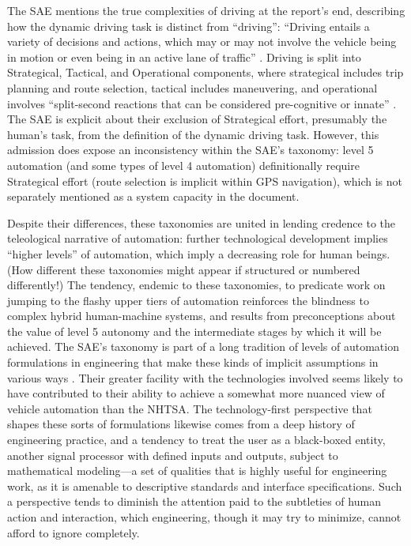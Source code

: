 The SAE mentions the true complexities of driving at the report's end,
describing how the dynamic driving task is distinct from ``driving'':
``Driving entails a variety of decisions and actions, which may or may
not involve the vehicle being in motion or even being in an active
lane of traffic'' \cite[p. 12]{SAE}. Driving is split into Strategical, Tactical, and
Operational components, where strategical includes trip planning and
route selection, tactical includes maneuvering, and operational
involves ``split-second reactions that can be considered pre-cognitive
or innate'' \cite{Michon}. The SAE is explicit about their exclusion of Strategical
effort, presumably the human's task, from the definition of the
dynamic driving task. However, this admission does expose an
inconsistency within the SAE's taxonomy: level 5 automation (and some
types of level 4 automation) definitionally require Strategical effort
(route selection is implicit within GPS navigation), which is not
separately mentioned as a system capacity in the document.

Despite their differences, these taxonomies are united in lending
credence to the teleological narrative of automation:  further
technological development implies ``higher levels'' of automation, which
imply a decreasing role for human beings. (How different these
taxonomies might appear if structured or numbered differently!)
The tendency, endemic to these taxonomies, to predicate work on
jumping to the flashy upper tiers of automation reinforces the
blindness to complex hybrid human-machine systems, and results from
preconceptions about the value of level 5 autonomy and the
intermediate stages by which it will be achieved. The SAE's taxonomy
is part of a long tradition of levels of automation formulations in
engineering that make these kinds of implicit assumptions in various
ways \cite{parasuramanW} \cite{PSWickens} \cite{ALFUS} \cite{SMART}. Their
greater facility with the technologies involved seems likely to have
contributed to their ability to achieve a somewhat more nuanced view
of vehicle automation than the NHTSA. The
technology-first perspective that shapes these sorts of formulations
likewise comes from a deep history of engineering practice, and a
tendency to treat the user as a black-boxed entity, another signal
processor with defined inputs and outputs, subject to mathematical
modeling---a set of qualities that is highly useful for engineering
work, as it is amenable to descriptive standards and interface
specifications. Such a perspective tends to diminish the attention
paid to
the subtleties of human action and interaction, which engineering,
though it may try to minimize, cannot afford to ignore completely.

